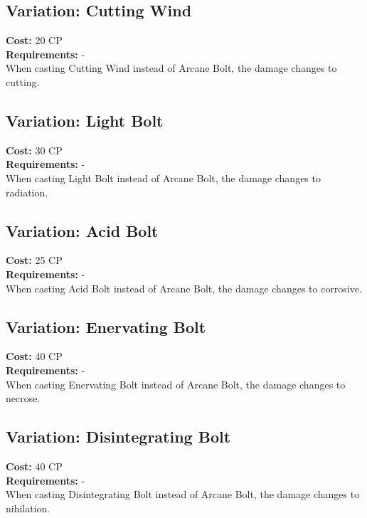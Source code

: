 \subsection{Variation: Cutting Wind}
\textbf{Cost:} 20 CP\\
\textbf{Requirements:} -\\
When casting Cutting Wind instead of Arcane Bolt, the damage changes to cutting.\\

\subsection{Variation: Light Bolt}
\textbf{Cost:} 30 CP\\
\textbf{Requirements:} -\\
When casting Light Bolt instead of Arcane Bolt, the damage changes to radiation.\\

\subsection{Variation: Acid Bolt}
\textbf{Cost:} 25 CP\\
\textbf{Requirements:} -\\
When casting Acid Bolt instead of Arcane Bolt, the damage changes to corrosive.\\

\subsection{Variation: Enervating Bolt}
\textbf{Cost:} 40 CP\\
\textbf{Requirements:} -\\
When casting Enervating Bolt instead of Arcane Bolt, the damage changes to necrose.\\

\subsection{Variation: Disintegrating Bolt}
\textbf{Cost:} 40 CP\\
\textbf{Requirements:} -\\
When casting Disintegrating Bolt instead of Arcane Bolt, the damage changes to nihilation.\\